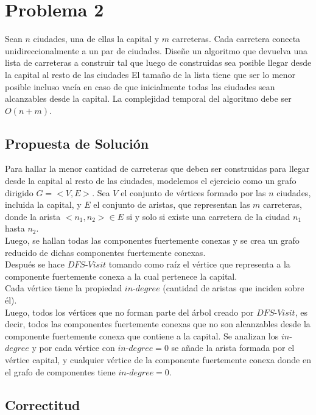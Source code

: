 \documentclass[a4paper,10pt]{article}
\begin{document}
	\section{Problema 2}
	Sean $n$ ciudades, una de ellas la capital y $m$ carreteras. Cada carretera conecta unidireccionalmente a un par de ciudades. Dise\~ne un algoritmo que devuelva una lista de carreteras a construir tal que luego de construidas sea posible llegar desde la capital al resto de las ciudades El tama\~no de la lista tiene que ser lo menor posible incluso vac\'ia en caso de que inicialmente todas las ciudades sean alcanzables desde la capital. La complejidad temporal del algoritmo debe ser $O(n + m)$.
	\subsection{Propuesta de Soluci\'on}
	Para hallar la menor cantidad de carreteras que deben ser construidas para llegar desde la capital al resto de las ciudades, modelemos el ejercicio como un grafo dirigido $G = <V,E>$. Sea $V$ el conjunto de v\'ertices formado por las $n$ ciudades, incluida la capital, y $E$ el conjunto de aristas, que representan las $m$ carreteras, donde la arista $<n_1,n_2> \in E$ si y solo si existe una carretera de la ciudad $n_1$ hasta $n_2$.
	\\Luego, se hallan todas las componentes fuertemente conexas y se crea un grafo reducido de dichas componentes fuertemente conexas.
	\\Despu\'es se hace $DFS$-$Visit$ tomando como ra\'iz el v\'ertice que representa a la componente fuertemente conexa a la cual pertenece la capital.
	\\Cada v\'ertice tiene la  propiedad $in$-$degree$ (cantidad de aristas que inciden sobre \'el).
	\\Luego, todos los v\'ertices que no forman parte del \'arbol creado por $DFS$-$Visit$, es decir, todos las componentes fuertemente conexas que no son alcanzables desde la componente fuertemente conexa que contiene a la capital. Se analizan los $in$-$degree$ y por cada v\'ertice con $in$-$degree = 0$ se a\~nade la arista formada por el v\'ertice capital, y cualquier v\'ertice de la componente fuertemente conexa donde en el grafo de componentes tiene $in$-$degree=0$.
	\subsection{Correctitud}
	
\end{document}
